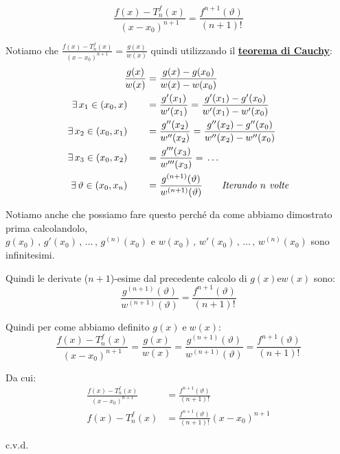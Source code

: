 \documentclass[../../dimostrazioni]{subfiles}
\begin{document}
            \[  \frac{f(x) - T _n ^ f (x)}{(x-x_0)^{n+1}} = \frac{f^{n+1}(\vartheta)}{(n+1)!}    \]

            Notiamo che \(  \frac{f(x) - T _n ^ f (x)}{(x-x_0)^{n+1}} = \frac{g(x)}{w(x)}    \) quindi utilizzando il \textbf{\hyperref[teoCauchy]{teorema di Cauchy}}:
            \begin{align*}
                \frac{g(x)}{w(x)} &= \frac{g(x) - g(x_0)}{w(x) - w(x_0)}\\
                \exists \, x_1 \in (x_0, x) \qquad &= \frac{g'(x_1)}{w'(x_1)} = \frac{g'(x_1) - g'(x_0)}{w'(x_1) - w'(x_0)}\\
                \exists \, x_2 \in (x_0, x_1) \qquad &= \frac{g''(x_2)}{w''(x_2)} = \frac{g''(x_2) - g''(x_0)}{w''(x_2) - w''(x_0)}\\
                \exists \, x_3 \in (x_0, x_2) \qquad &= \frac{g'''(x_3)}{w'''(x_3)} = \, \dots\\
                \exists \, \vartheta \in (x_0, x_n) \qquad &= \frac{g^{(n+1)}(\vartheta)}{w^{(n+1)}(\vartheta)} \qquad \text{\emph{Iterando \(n\) volte}}
            \end{align*}

            Notiamo anche che possiamo fare questo perché da come abbiamo dimostrato prima calcolandolo,\\
            \(g(x_0)\,,\, g'(x_0)\,,\, \dots\,,\, g^{(n)} (x_0) \) e \( w(x_0)\,,\, w'(x_0)\,,\, \dots\,,\, w^{(n)} (x_0)\) sono infinitesimi.\\

            \newpage
            
            Quindi le derivate (\(n+1\))-esime dal precedente calcolo di \(g(x) \text{e} w(x)\) sono:
            \[  \frac{g^{(n+1)}(\vartheta)}{w^{(n+1)}(\vartheta)} = \frac{f^{n+1}(\vartheta)}{(n+1)!} \]

            Quindi per come abbiamo definito \(g(x) \; \text{e} \; w(x)\):
            \[  \frac{f(x) - T _n ^ f (x)}{(x-x_0)^{n+1}} = \frac{g(x)}{w(x)} = \frac{g^{(n+1)}(\vartheta)}{w^{(n+1)}(\vartheta)} = \frac{f^{n+1}(\vartheta)}{(n+1)!}   \]

            Da cui:
            \begin{align*}
                \frac{f(x) - T _n ^ f (x)}{(x-x_0)^{n+1}} &= \frac{f^{n+1}(\vartheta)}{(n+1)!}\\
                f(x) - T _n ^ f (x) &= \frac{f^{n+1}(\vartheta)}{(n+1)!}(x-x_0)^{n+1}
            \end{align*}

            c.v.d.
        
\end{document}
